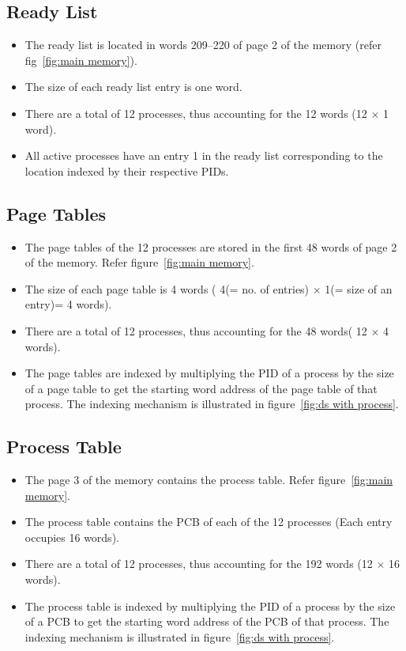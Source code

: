 \subsection{Ready List}
\begin{itemize}
	\item The ready list is located in words 209--220 of page 2 of the memory (refer fig~\ref{fig:main memory}).
	\item The size of each ready list entry is one word.
	\item There are a total of 12 processes, thus accounting for the 12 words (12 $\times$ 1 word).
	\item All active processes have an entry 1 in the ready list corresponding to the location indexed by their respective PIDs.
\end{itemize}

\subsection{Page Tables}
\begin{itemize}
	\item The page tables of the 12 processes are stored in the first 48 words of page 2 of the memory. Refer figure~\ref{fig:main memory}.
	\item The size of each page table is 4 words ( 4(= no. of entries) $\times$ 1(= size of an entry)= 4 words).
	\item There are a total of 12 processes, thus accounting for the 48 words( 12 $\times$ 4 words).
	\item The page tables are indexed by multiplying the PID of a process by the size of a page table to get the starting word address of the page table of that process.  The indexing mechanism is illustrated in figure~\ref{fig:ds with process}.
\end{itemize}

\subsection{Process Table}
\label{lbl:proctbl}
\begin{itemize}
	\item The page 3 of the memory contains the process table. Refer figure~\ref{fig:main memory}.
	\item The process table contains the PCB of each of the 12 processes (Each entry occupies 16 words).
	\item There are a total of 12 processes, thus accounting for the 192 words (12 $\times$ 16 words).
	\item The process table is indexed by multiplying the PID of a process by the size of a PCB to get the starting word address of the PCB of that process. The indexing mechanism is illustrated in figure~\ref{fig:ds with process}.
\end{itemize}
